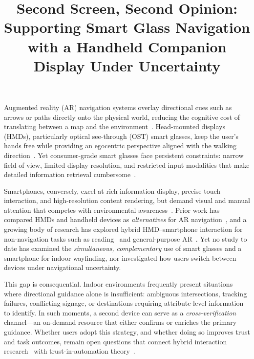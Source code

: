\documentclass[review]{vgtc}           %
\title{Second Screen, Second Opinion: Supporting Smart Glass Navigation with a Handheld Companion Display Under Uncertainty}
\begin{document}
\maketitle


Augmented reality (AR) navigation systems overlay directional cues
such as arrows or paths directly onto the physical world, reducing the
cognitive cost of translating between a map and the
environment~\cite{Qiu:2025:UAR}. Head-mounted displays (HMDs),
particularly optical see-through (OST) smart glasses, keep the user's
hands free while providing an egocentric perspective aligned with the
walking direction~\cite{Rehman:2017:ARI, Neeson:2025:CHM}. Yet
consumer-grade smart glasses face persistent constraints: narrow field
of view, limited display resolution, and restricted input modalities
that make detailed information retrieval
cumbersome~\cite{Li:2023:ERH, AReading:2025:RSU, Baumeister:2017:CCU}.

Smartphones, conversely, excel at rich information display, precise
touch interaction, and high-resolution content rendering, but demand
visual and manual attention that competes with environmental
awareness~\cite{Putra:2025:AAN, Sharin:2023:GCS}. Prior work has
compared HMDs and handheld devices as \emph{alternatives} for AR
navigation~\cite{Rehman:2017:ARI, Neeson:2025:CHM, Qiu:2025:UAR},
and a growing body of research has explored hybrid HMD--smartphone
interaction for non-navigation tasks such as
reading~\cite{AReading:2025:RSU, Li:2023:ERH} and general-purpose
AR~\cite{Zhu:2020:BIS, Grubert:2015:MFI}. Yet no study to date has
examined the \emph{simultaneous, complementary} use of smart glasses
and a smartphone for indoor wayfinding, nor investigated how users
switch between devices under navigational uncertainty.

This gap is consequential. Indoor environments frequently present
situations where directional guidance alone is insufficient: ambiguous
intersections, tracking failures, conflicting signage, or destinations
requiring attribute-level information to identify. In such moments, a
second device can serve as a \emph{cross-verification}
channel---an on-demand resource that either confirms or enriches the
primary guidance. Whether users adopt this strategy, and whether doing
so improves trust and task outcomes, remain open questions
that connect hybrid interaction research~\cite{Hubenschmid:2025:HUI,
Brudy:2019:CDT} with trust-in-automation
theory~\cite{Lee:2004:TAS, Chiou:2023:TAD}.
\end{document}
